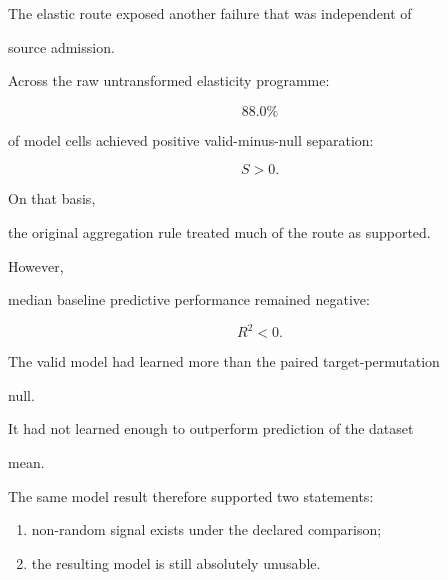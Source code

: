 \documentclass[11pt,a4paper,oneside]{report}
\begin{document}
The elastic route exposed another failure that was independent of

source admission.



Across the raw untransformed elasticity programme:



\begin{equation}
88.0\%
\end{equation}



of model cells achieved positive valid-minus-null separation:



\begin{equation}
S>0.
\end{equation}



On that basis,

the original aggregation rule treated much of the route as supported.



However,

median baseline predictive performance remained negative:



\begin{equation}
R^2<0.
\end{equation}



The valid model had learned more than the paired target-permutation

null.



It had not learned enough to outperform prediction of the dataset

mean.



The same model result therefore supported two statements:



\begin{enumerate}



\item

non-random signal exists under the declared comparison;



\item

the resulting model is still absolutely unusable.



\end{enumerate}
\end{document}
